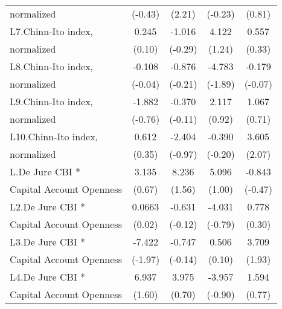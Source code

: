 {\begin{tabular}{l*{4}{c}}
normalized          &     (-0.43)         &      (2.21)         &     (-0.23)         &      (0.81)         \\
[1em]
L7.Chinn-Ito index, &       0.245         &      -1.016         &       4.122         &       0.557         \\
normalized          &      (0.10)         &     (-0.29)         &      (1.24)         &      (0.33)         \\
[1em]
L8.Chinn-Ito index, &      -0.108         &      -0.876         &      -4.783         &      -0.179         \\
normalized          &     (-0.04)         &     (-0.21)         &     (-1.89)         &     (-0.07)         \\
[1em]
L9.Chinn-Ito index, &      -1.882         &      -0.370         &       2.117         &       1.067         \\
normalized          &     (-0.76)         &     (-0.11)         &      (0.92)         &      (0.71)         \\
[1em]
L10.Chinn-Ito index,&       0.612         &      -2.404         &      -0.390         &       3.605\sym{*}  \\
normalized          &      (0.35)         &     (-0.97)         &     (-0.20)         &      (2.07)         \\
[1em]
L.De Jure CBI *     &       3.135         &       8.236         &       5.096         &      -0.843         \\
Capital Account Openness&      (0.67)         &      (1.56)         &      (1.00)         &     (-0.47)         \\
[1em]
L2.De Jure CBI *    &      0.0663         &      -0.631         &      -4.031         &       0.778         \\
Capital Account Openness&      (0.02)         &     (-0.12)         &     (-0.79)         &      (0.30)         \\
[1em]
L3.De Jure CBI *    &      -7.422\sym{*}  &      -0.747         &       0.506         &       3.709         \\
Capital Account Openness&     (-1.97)         &     (-0.14)         &      (0.10)         &      (1.93)         \\
[1em]
L4.De Jure CBI *    &       6.937         &       3.975         &      -3.957         &       1.594         \\
Capital Account Openness&      (1.60)         &      (0.70)         &     (-0.90)         &      (0.77)         \\

\end{tabular}}
